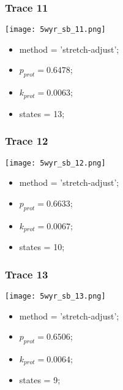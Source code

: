 \subsubsection{Trace 11}
\begin{minipage}[c]{0.7\textwidth}
    \texttt{[image: 5wyr\_sb\_11.png]}
\end{minipage}
\hfill
\begin{minipage}[c]{0.45\textwidth}
    \begin{itemize}
        \item method = 'stretch-adjust';
        \item $p_{prot}=0.6478$;
        \item $k_{prot}=0.0063$;
        \item states = 13;
    \end{itemize}
\end{minipage}

\subsubsection{Trace 12}
\begin{minipage}[c]{0.7\textwidth}
    \texttt{[image: 5wyr\_sb\_12.png]}
\end{minipage}
\hfill
\begin{minipage}[c]{0.45\textwidth}
    \begin{itemize}
        \item method = 'stretch-adjust';
        \item $p_{prot}=0.6633$;
        \item $k_{prot}=0.0067$;
        \item states = 10;
    \end{itemize}
\end{minipage}

\subsubsection{Trace 13}
\begin{minipage}[c]{0.7\textwidth}
    \texttt{[image: 5wyr\_sb\_13.png]}
\end{minipage}
\hfill
\begin{minipage}[c]{0.45\textwidth}
    \begin{itemize}
        \item method = 'stretch-adjust';
        \item $p_{prot}=0.6506$;
        \item $k_{prot}=0.0064$;
        \item states = 9;
    \end{itemize}
\end{minipage}

